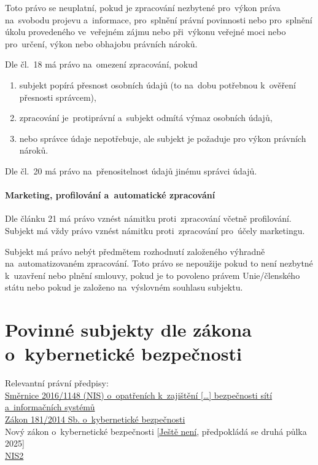 Toto právo se neuplatní, pokud je zpracování nezbytené pro~výkon práva na~svobodu projevu a~informace, pro~splnění právní povinnosti nebo pro~splnění úkolu provedeného ve~veřejném zájmu nebo při~výkonu veřejné moci nebo pro~určení, výkon nebo obhajobu právních nároků.

Dle čl.~18 má právo na~omezení zpracování, pokud

\begin{enumerate}[label=\alph*)]
\item subjekt popírá přesnost osobních údajů (to na~dobu potřebnou k~ověření přesnosti správcem),
\item zpracování je~protiprávní a~subjekt odmítá výmaz osobních údajů,
\item nebo správce údaje nepotřebuje, ale subjekt je požaduje pro výkon právních nároků.
\end{enumerate}

Dle čl.~20 má právo na~přenositelnost údajů jinému správci údajů.

\paragraph{Marketing, profilování a~automatické zpracování}

Dle článku 21 má právo vznést námitku proti~zpracování včetně profilování.
Subjekt má vždy právo vznést námitku proti~zpracování pro~účely marketingu.

Subjekt má právo nebýt předmětem rozhodnutí založeného výhradně na~automatizovaném zpracování.
Toto právo se nepoužije pokud to není nezbytné k~uzavření nebo plnění smlouvy, pokud je to povoleno právem Unie/členského státu nebo pokud je založeno na~výslovném souhlasu subjektu.


\clearpage
\section{Povinné subjekty dle zákona o~kybernetické bezpečnosti}

{}Relevantní právní předpisy:
\\\href{https://eur-lex.europa.eu/legal-content/CS/TXT/?uri=uriserv:OJ.L_.2016.194.01.0001.01.CES
}{Směrnice 2016/1148 (NIS) o~opatřeních k~zajištění [\dots] bezpečnosti sítí a~informačních systémů}
\\\href{https://www.zakonyprolidi.cz/cs/2014-181}{Zákon 181/2014 Sb. o~kybernetické bezpečnosti}
\\Nový zákon o~kybernetické bezpečnosti [\href{https://portal.nukib.gov.cz/pruvodce-novym-zakonem-o-kyberneticke-bezpecnosti}{Ještě není}, předpokládá se druhá půlka 2025]
\\\href{https://eur-lex.europa.eu/legal-content/CS/TXT/HTML/?uri=CELEX:32022L2555}{NIS2}

